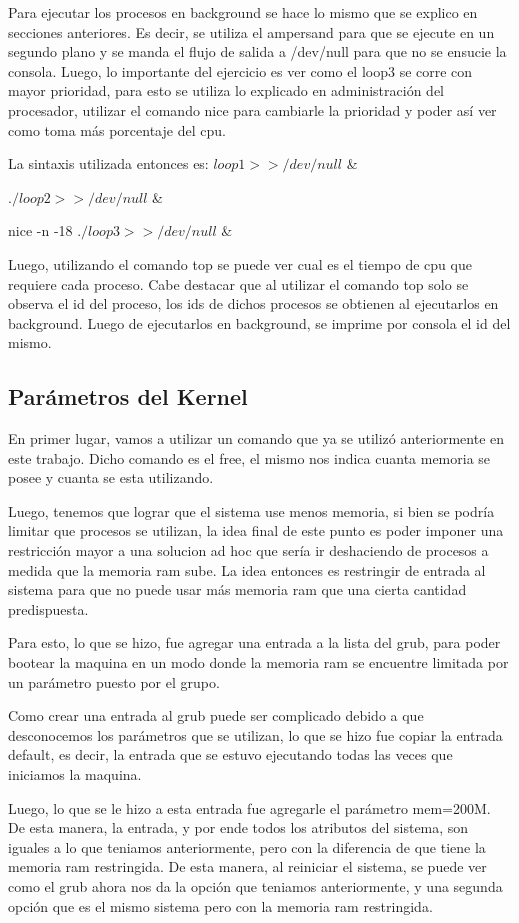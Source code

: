 \documentclass[a4paper, 12pt]{article}
\begin{document}
Para ejecutar los procesos en background se hace lo mismo que se explico en secciones anteriores. Es decir, se utiliza el ampersand para que se ejecute en un segundo plano y se manda el flujo de salida a /dev/null para que no se ensucie la consola. Luego, lo importante del ejercicio es ver como el loop3 se corre con mayor prioridad, para esto se utiliza lo explicado en administraci\'on del procesador, utilizar el comando nice para cambiarle la prioridad y poder as\'i ver como toma m\'as porcentaje del cpu.

La sintaxis utilizada entonces es:
$loop1 >> /dev/null$ \&

$./loop2 >> /dev/null$ \&

nice -n -18 $./loop3 >> /dev/null$ \&


Luego, utilizando el comando top se puede ver cual es el tiempo de cpu que requiere cada proceso. Cabe destacar que al utilizar el comando top solo se observa el id del proceso, los ids de dichos procesos se obtienen al ejecutarlos en background. Luego de ejecutarlos en background, se imprime por consola el id del mismo.

\subsection*{Par\'ametros del Kernel}

En primer lugar, vamos a utilizar un comando que ya se utiliz\'o anteriormente en este trabajo. Dicho comando es el free, el mismo nos indica cuanta memoria se posee y cuanta se esta utilizando.

Luego, tenemos que lograr que el sistema use menos memoria, si bien se podr\'ia limitar que procesos se utilizan, la idea final de este punto es poder imponer una restricci\'on mayor a una solucion ad hoc que ser\'ia ir deshaciendo de procesos a medida que la memoria ram sube. La idea entonces es restringir de entrada al sistema para que no puede usar m\'as memoria ram que una cierta cantidad predispuesta.

Para esto, lo que se hizo, fue agregar una entrada a la lista del grub, para poder bootear la maquina en un modo donde la memoria ram se encuentre limitada por un par\'ametro puesto por el grupo.

Como crear una entrada al grub puede ser complicado debido a que desconocemos los par\'ametros que se utilizan, lo que se hizo fue copiar la entrada default, es decir, la entrada que se estuvo ejecutando todas las veces que iniciamos la maquina. 

Luego, lo que se le hizo a esta entrada fue agregarle el par\'ametro mem=200M. De esta manera, la entrada, y por ende todos los atributos del sistema, son iguales a lo que teniamos anteriormente, pero con la diferencia de que tiene la memoria ram restringida. De esta manera, al reiniciar el sistema, se puede ver como el grub ahora nos da la opci\'on que teniamos anteriormente, y una segunda opci\'on que es el mismo sistema pero con la memoria ram restringida. 
\end{document}
